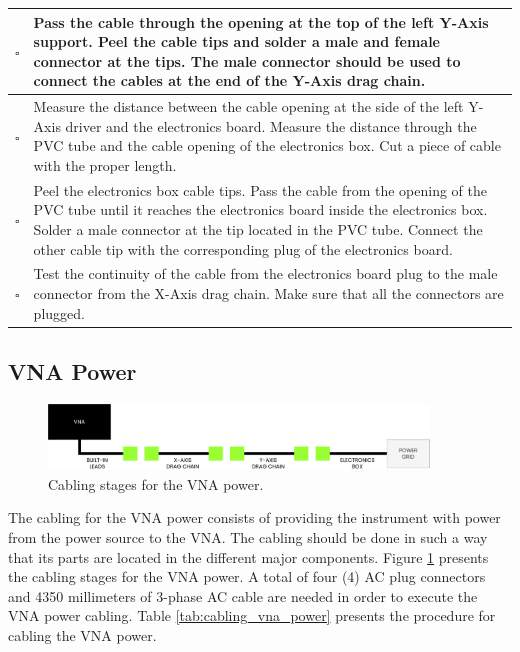 \documentclass{article}
\begin{document}
\begin{singlespace}
\begin{xltabular}{\textwidth}{|c|X|}
    $\square$ & Pass the cable through the opening at the top of the left Y-Axis support. Peel the cable tips and solder a male and female connector at the tips. The male connector should be used to connect the cables at the end of the Y-Axis drag chain. \\ \hline
    $\square$ & Measure the distance between the cable opening at the side of the left Y-Axis driver and the electronics board. Measure the distance through the PVC tube and the cable opening of the electronics box. Cut a piece of cable with the proper length. \\ \hline
    $\square$ & Peel the  electronics box cable tips. Pass the cable from the opening of the PVC tube until it reaches the electronics board inside the electronics box. Solder a male connector at the tip located in the PVC tube. Connect the other cable tip with the corresponding plug of the electronics board. \\ \hline
    $\square$ & Test the continuity of the cable from the electronics board plug to the male connector from the X-Axis drag chain. Make sure that all the connectors are plugged. \\ \hline 
\end{xltabular}
\end{singlespace}

\subsection{VNA Power}
\begin{figure}[H]
    \centering
    \includegraphics[width=0.9\textwidth]{images/cabling/vna_power_cabling.pdf}
    \caption{Cabling stages for the VNA power.}
    \label{fig:cabling_vna_power}
\end{figure}
The cabling for the VNA power consists of providing the instrument with power from the power source to the VNA. The cabling should be done in such a way that its parts are located in the different major components. Figure \ref{fig:cabling_vna_power} presents the cabling stages for the VNA power. A total of four (4) AC plug connectors and 4350 millimeters of 3-phase AC cable are needed in order to execute the VNA power cabling. Table \ref{tab:cabling_vna_power} presents the procedure for cabling the VNA power.
\end{document}
